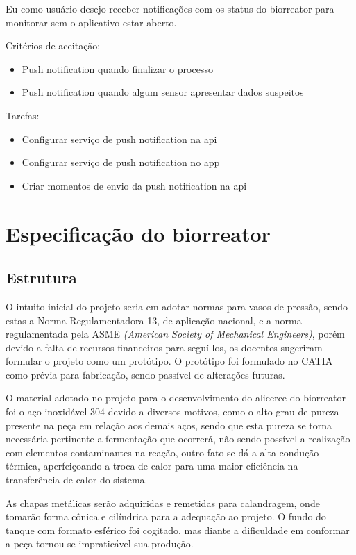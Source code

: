 Eu como usuário desejo receber notificações com os status do biorreator para monitorar sem o aplicativo estar aberto.

Critérios de aceitação:
\begin{itemize}
  \item Push notification quando finalizar o processo
  \item Push notification quando algum sensor apresentar dados suspeitos
\end{itemize}

Tarefas:
\begin{itemize}
  \item Configurar serviço de push notification na api
  \item Configurar serviço de push notification no app
  \item Criar momentos de envio da push notification na api
\end{itemize}

\section{Especificação do biorreator}

\subsection{Estrutura}

O intuito inicial do projeto seria em adotar normas para vasos de pressão, sendo estas a Norma Regulamentadora 13, de aplicação nacional, e a norma regulamentada pela ASME \textit{(American Society of Mechanical Engineers)}, porém devido a falta de recursos financeiros para seguí-los, os docentes sugeriram formular o projeto como um protótipo. O protótipo foi formulado no CATIA como prévia para fabricação, sendo passível de alterações futuras.

O material adotado no projeto para o desenvolvimento do alicerce do biorreator foi o aço inoxidável 304 devido a diversos motivos, como o alto grau de pureza presente na peça em relação aos demais aços, sendo que esta pureza se torna necessária pertinente a fermentação que ocorrerá, não sendo possível a realização com elementos contaminantes na reação, outro fato se dá a alta condução térmica, aperfeiçoando a troca de calor para uma maior eficiência na transferência de calor do sistema.

As chapas metálicas serão adquiridas e remetidas para calandragem, onde tomarão forma cônica e cilíndrica para a adequação  ao projeto. O fundo do tanque com formato esférico foi cogitado, mas diante a dificuldade em conformar a peça tornou-se impraticável sua produção.


